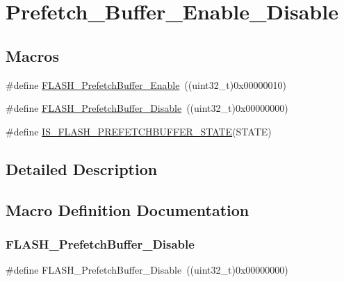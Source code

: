 \hypertarget{group___prefetch___buffer___enable___disable}{}\section{Prefetch\+\_\+\+Buffer\+\_\+\+Enable\+\_\+\+Disable}
\label{group___prefetch___buffer___enable___disable}
\subsection*{Macros}
\begin{DoxyCompactItemize}
\item 
\#define \mbox{\hyperlink{group___prefetch___buffer___enable___disable_gad0fac43d078a77794f22840f326a6ed9}{F\+L\+A\+S\+H\+\_\+\+Prefetch\+Buffer\+\_\+\+Enable}}~((uint32\+\_\+t)0x00000010)
\item 
\#define \mbox{\hyperlink{group___prefetch___buffer___enable___disable_ga2feb631ad85449f83517f05aaf4ba26c}{F\+L\+A\+S\+H\+\_\+\+Prefetch\+Buffer\+\_\+\+Disable}}~((uint32\+\_\+t)0x00000000)
\item 
\#define \mbox{\hyperlink{group___prefetch___buffer___enable___disable_ga5fd6932c4f4e157a1d6e73d433df092f}{I\+S\+\_\+\+F\+L\+A\+S\+H\+\_\+\+P\+R\+E\+F\+E\+T\+C\+H\+B\+U\+F\+F\+E\+R\+\_\+\+S\+T\+A\+TE}}(S\+T\+A\+TE)
\end{DoxyCompactItemize}


\subsection{Detailed Description}


\subsection{Macro Definition Documentation}
\mbox{\label{group___prefetch___buffer___enable___disable_ga2feb631ad85449f83517f05aaf4ba26c}} 
\subsubsection{\texorpdfstring{FLASH\_PrefetchBuffer\_Disable}{FLASH\_PrefetchBuffer\_Disable}}
{\footnotesize\ttfamily \#define F\+L\+A\+S\+H\+\_\+\+Prefetch\+Buffer\+\_\+\+Disable~((uint32\+\_\+t)0x00000000)}

